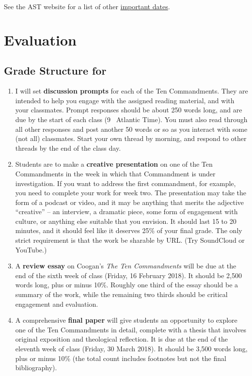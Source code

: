 \documentclass[titlepage]{article}
\begin{document}
See the AST website for a list of other \href{http://www.astheology.ns.ca/students/academic-dates.html}{important dates}.

\section{Evaluation}
\label{evaluation}

\subsection{Grade Structure for \ccode}
\label{structure}

\begin{enumerate}

	\item I will set \textbf{discussion prompts} for each of the Ten
	Commandments. They are intended to help you engage with the assigned
	reading material, and with your classmates. Prompt responses should
	be about 250 words long, and are due by the start of each class (9
	\AM\ Atlantic Time). You must also read through all other responses
	and post another 50 words or so as you interact with some (not all)
	classmates. Start your own thread by morning, and respond to other
	threads by the end of the class day.

	\item Students are to make a \textbf{creative presentation} on one
	of the Ten Commandments in the week in which that Commandment is
	under investigation. If you want to address the first commandment,
	for example, you need to complete your work for week two. The
	presentation may take the form of a podcast or video, and it may be
	anything that merits the adjective “creative” -- an interview, a
	dramatic piece, some form of engagement with culture, or anything
	else suitable that you envision. It should last 15 to 20 minutes,
	and it should feel like it deserves 25\% of your final grade. The
	only strict requirement is that the work be sharable by URL. (Try
	SoundCloud or YouTube.)

	\item A \textbf{review essay} on Coogan's \emph{The Ten
	Commandments} will be due at the end of the sixth week of class
	(Friday, 16 February 2018). It should be 2,500 words long, plus or
	minus 10\%. Roughly one third of the essay should be a summary of
	the work, while the remaining two thirds should be critical
	engagement and evaluation.

	\item A comprehensive \textbf{final paper} will give students an
	opportunity to explore one of the Ten Commandments in detail,
	complete with a thesis that involves original exposition and
	theological reflection. It is due at the end of the eleventh week of
	class (Friday, 30 March 2018). It should be 3,500 words long, plus
	or minus 10\% (the total count includes footnotes but not the final
	bibliography).

\end{enumerate}
\end{document}
